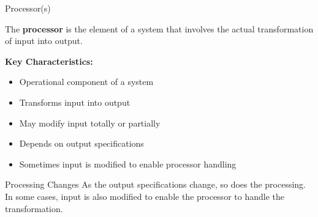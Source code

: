 \documentclass[aspectratio=169]{beamer}
\begin{document}
\begin{frame}{Processor(s)}
    \begin{definition}
        The \textbf{processor} is the element of a system that involves the actual transformation of input into output.
    \end{definition}
    
    \vspace{0.5cm}
    \textbf{Key Characteristics:}
    \begin{itemize}
        \item   Operational component of a system
        \item  Transforms input into output
        \item  May modify input totally or partially
        \item  Depends on output specifications
        \item  Sometimes input is modified to enable processor handling
    \end{itemize}
    
    \vspace{0.3cm}
    \begin{exampleblock}{Processing Changes}
        As the output specifications change, so does the processing. In some cases, input is also modified to enable the processor to handle the transformation.
    \end{exampleblock}
\end{frame}
\end{document}
